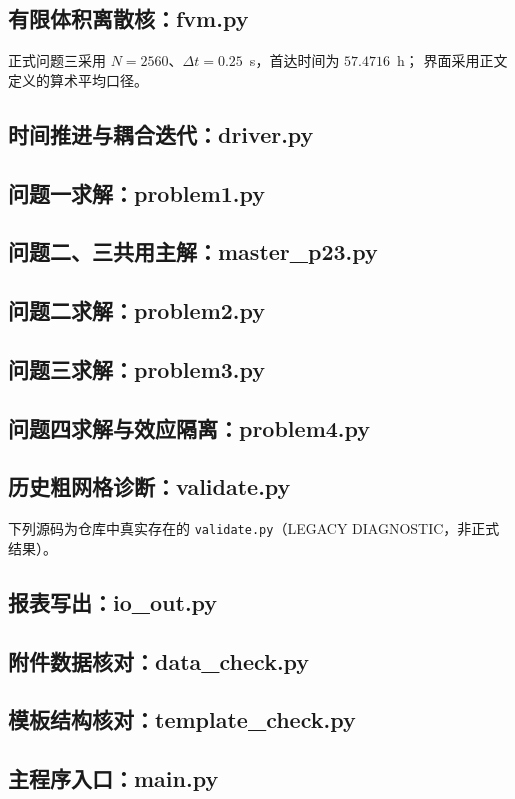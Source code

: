 \subsection{有限体积离散核：fvm.py}
正式问题三采用 $N=2560$、$\Delta t=0.25$~s，首达时间为 $57.4716$~h；
界面采用正文定义的算术平均口径。


\subsection{时间推进与耦合迭代：driver.py}


\subsection{问题一求解：problem1.py}


\subsection{问题二、三共用主解：master\_p23.py}


\subsection{问题二求解：problem2.py}


\subsection{问题三求解：problem3.py}


\subsection{问题四求解与效应隔离：problem4.py}


\subsection{历史粗网格诊断：validate.py}
下列源码为仓库中真实存在的 \verb|validate.py|（LEGACY DIAGNOSTIC，非正式结果）。


\subsection{报表写出：io\_out.py}


\subsection{附件数据核对：data\_check.py}


\subsection{模板结构核对：template\_check.py}


\subsection{主程序入口：main.py}

